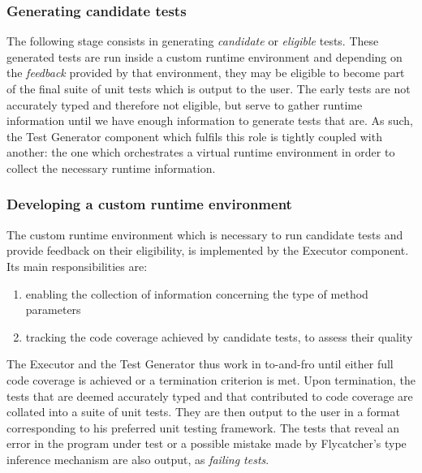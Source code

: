 \subsubsection{Generating candidate tests}
The following stage consists in generating \emph{candidate} or \emph{eligible} tests. These generated tests are run inside a custom runtime environment and depending on the \emph{feedback} provided by that environment, they may be eligible to become part of the final suite of unit tests which is output to the user. The early tests are not accurately typed and therefore not eligible, but serve to gather runtime information until we have enough information to generate tests that are. As such, the \textsf{Test Generator} component which fulfils this role is tightly coupled with another: the one which orchestrates a virtual runtime environment in order to collect the necessary runtime information.

\subsubsection{Developing a custom runtime environment}
The custom runtime environment which is necessary to run candidate tests and provide feedback on their eligibility, is implemented by the \textsf{Executor} component. Its main responsibilities are:
\begin{enumerate}
   \item enabling the collection of information concerning the type of method parameters
   \item tracking the code coverage achieved by candidate tests, to assess their quality
\end{enumerate}

The \textsf{Executor} and the \textsf{Test Generator} thus work in to-and-fro until either full code coverage is achieved or a termination criterion is met. Upon termination, the tests that are deemed accurately typed and that contributed to code coverage are collated into a suite of unit tests. They are then output to the user in a format corresponding to his preferred unit testing framework. The tests that reveal an error in the program under test or a possible mistake made by \textsf{Flycatcher}'s type inference mechanism are also output, as \emph{failing tests}.

